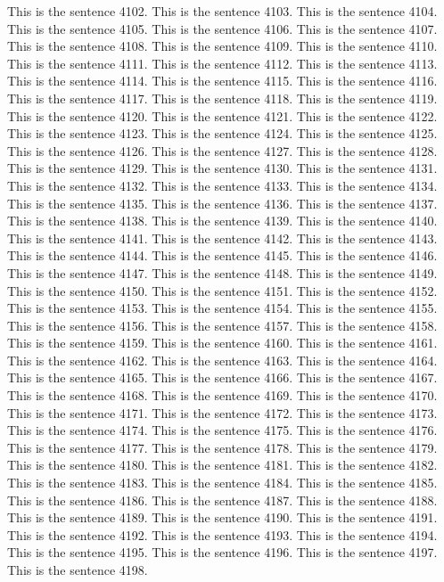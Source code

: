 \documentclass{article}
\begin{document}
This is the sentence 4102.
This is the sentence 4103.
This is the sentence 4104.
This is the sentence 4105.
This is the sentence 4106.
This is the sentence 4107.
This is the sentence 4108.
This is the sentence 4109.
This is the sentence 4110.
This is the sentence 4111.
This is the sentence 4112.
This is the sentence 4113.
This is the sentence 4114.
This is the sentence 4115.
This is the sentence 4116.
This is the sentence 4117.
This is the sentence 4118.
This is the sentence 4119.
This is the sentence 4120.
This is the sentence 4121.
This is the sentence 4122.
This is the sentence 4123.
This is the sentence 4124.
This is the sentence 4125.
This is the sentence 4126.
This is the sentence 4127.
This is the sentence 4128.
This is the sentence 4129.
This is the sentence 4130.
This is the sentence 4131.
This is the sentence 4132.
This is the sentence 4133.
This is the sentence 4134.
This is the sentence 4135.
This is the sentence 4136.
This is the sentence 4137.
This is the sentence 4138.
This is the sentence 4139.
This is the sentence 4140.
This is the sentence 4141.
This is the sentence 4142.
This is the sentence 4143.
This is the sentence 4144.
This is the sentence 4145.
This is the sentence 4146.
This is the sentence 4147.
This is the sentence 4148.
This is the sentence 4149.
This is the sentence 4150.
This is the sentence 4151.
This is the sentence 4152.
This is the sentence 4153.
This is the sentence 4154.
This is the sentence 4155.
This is the sentence 4156.
This is the sentence 4157.
This is the sentence 4158.
This is the sentence 4159.
This is the sentence 4160.
This is the sentence 4161.
This is the sentence 4162.
This is the sentence 4163.
This is the sentence 4164.
This is the sentence 4165.
This is the sentence 4166.
This is the sentence 4167.
This is the sentence 4168.
This is the sentence 4169.
This is the sentence 4170.
This is the sentence 4171.
This is the sentence 4172.
This is the sentence 4173.
This is the sentence 4174.
This is the sentence 4175.
This is the sentence 4176.
This is the sentence 4177.
This is the sentence 4178.
This is the sentence 4179.
This is the sentence 4180.
This is the sentence 4181.
This is the sentence 4182.
This is the sentence 4183.
This is the sentence 4184.
This is the sentence 4185.
This is the sentence 4186.
This is the sentence 4187.
This is the sentence 4188.
This is the sentence 4189.
This is the sentence 4190.
This is the sentence 4191.
This is the sentence 4192.
This is the sentence 4193.
This is the sentence 4194.
This is the sentence 4195.
This is the sentence 4196.
This is the sentence 4197.
This is the sentence 4198.
\end{document}
